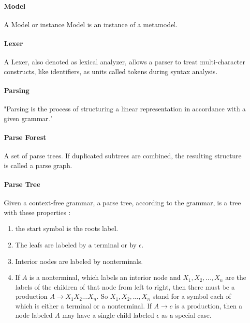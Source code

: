 \paragraph{Model} A Model or instance Model is an instance of a metamodel.


\paragraph{Lexer}
A Lexer, also denoted as lexical analyzer, allows a parser to treat multi-character constructs, like identifiers, as units called tokens during syntax analysis. \cite{DragonBook}




\paragraph{Parsing} 
"Parsing is the process of structuring a linear representation in accordance with a given grammar." \cite{ParserBook}

\paragraph{Parse Forest} 
A set of parse trees. If duplicated subtrees are combined, the resulting structure is called a parse graph. \cite{ParserBook}

\paragraph{Parse Tree}
Given a context-free grammar, a parse tree, according to the grammar, is a tree with these properties \cite{DragonBook}:
\begin{enumerate}
	\item the start symbol is the roots label.
	\item The leafs are labeled by a terminal or by $\epsilon$.
	\item Interior nodes are labeled by nonterminals.
	\item If $A$ is a nonterminal, which labels an interior node and $X_1, X_2, . . . , X_n$ are the labels of the children of that node from left to right, then there must be a production $A  \rightarrow X_1X_2 ... X_n$. So $X_1, X_2, ... , X_n$ stand for a symbol each of which is either a terminal or a nonterminal. If $A\rightarrow c$ is a production, then a node labeled $A$ may have a single child labeled $\epsilon$ as a special case. 
\end{enumerate}
